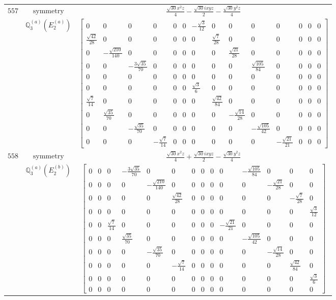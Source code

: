 \documentclass[fleqn,8pt,landscape]{jsarticle}
\begin{document}
\begin{longtable}{ccc}
$ 557 $ & $ \text{symmetry} $ & $ \frac{\sqrt{30} x^{2} z}{4} - \frac{\sqrt{30} i x y z}{2} - \frac{\sqrt{30} y^{2} z}{4} $ \\
$  $ & $ \mathbb{Q}_{3}^{(a)}(E_{2}^{(a)}) $ & $ \begin{bmatrix} 0 & 0 & 0 & 0 & 0 & 0 & - \frac{\sqrt{3}}{12} & 0 & 0 & 0 & 0 & 0 & 0 & 0 \\ \frac{\sqrt{42}}{28} & 0 & 0 & 0 & 0 & 0 & 0 & \frac{\sqrt{7}}{28} & 0 & 0 & 0 & 0 & 0 & 0 \\ 0 & - \frac{\sqrt{210}}{140} & 0 & 0 & 0 & 0 & 0 & 0 & \frac{\sqrt{21}}{28} & 0 & 0 & 0 & 0 & 0 \\ 0 & 0 & - \frac{3 \sqrt{35}}{70} & 0 & 0 & 0 & 0 & 0 & 0 & \frac{\sqrt{105}}{84} & 0 & 0 & 0 & 0 \\ 0 & 0 & 0 & 0 & 0 & 0 & 0 & 0 & 0 & 0 & 0 & 0 & 0 & 0 \\ 0 & 0 & 0 & 0 & 0 & 0 & \frac{\sqrt{3}}{6} & 0 & 0 & 0 & 0 & 0 & 0 & 0 \\ \frac{\sqrt{7}}{14} & 0 & 0 & 0 & 0 & 0 & 0 & \frac{\sqrt{42}}{84} & 0 & 0 & 0 & 0 & 0 & 0 \\ 0 & \frac{\sqrt{35}}{70} & 0 & 0 & 0 & 0 & 0 & 0 & - \frac{\sqrt{14}}{28} & 0 & 0 & 0 & 0 & 0 \\ 0 & 0 & - \frac{\sqrt{35}}{70} & 0 & 0 & 0 & 0 & 0 & 0 & - \frac{\sqrt{105}}{42} & 0 & 0 & 0 & 0 \\ 0 & 0 & 0 & - \frac{\sqrt{7}}{14} & 0 & 0 & 0 & 0 & 0 & 0 & - \frac{\sqrt{21}}{21} & 0 & 0 & 0 \end{bmatrix} $ \\ \hline
$ 558 $ & $ \text{symmetry} $ & $ \frac{\sqrt{30} x^{2} z}{4} + \frac{\sqrt{30} i x y z}{2} - \frac{\sqrt{30} y^{2} z}{4} $ \\
$  $ & $ \mathbb{Q}_{3}^{(a)}(E_{2}^{(b)}) $ & $ \begin{bmatrix} 0 & 0 & 0 & - \frac{3 \sqrt{35}}{70} & 0 & 0 & 0 & 0 & 0 & 0 & - \frac{\sqrt{105}}{84} & 0 & 0 & 0 \\ 0 & 0 & 0 & 0 & - \frac{\sqrt{210}}{140} & 0 & 0 & 0 & 0 & 0 & 0 & - \frac{\sqrt{21}}{28} & 0 & 0 \\ 0 & 0 & 0 & 0 & 0 & \frac{\sqrt{42}}{28} & 0 & 0 & 0 & 0 & 0 & 0 & - \frac{\sqrt{7}}{28} & 0 \\ 0 & 0 & 0 & 0 & 0 & 0 & 0 & 0 & 0 & 0 & 0 & 0 & 0 & \frac{\sqrt{3}}{12} \\ 0 & 0 & \frac{\sqrt{7}}{14} & 0 & 0 & 0 & 0 & 0 & 0 & - \frac{\sqrt{21}}{21} & 0 & 0 & 0 & 0 \\ 0 & 0 & 0 & \frac{\sqrt{35}}{70} & 0 & 0 & 0 & 0 & 0 & 0 & - \frac{\sqrt{105}}{42} & 0 & 0 & 0 \\ 0 & 0 & 0 & 0 & - \frac{\sqrt{35}}{70} & 0 & 0 & 0 & 0 & 0 & 0 & - \frac{\sqrt{14}}{28} & 0 & 0 \\ 0 & 0 & 0 & 0 & 0 & - \frac{\sqrt{7}}{14} & 0 & 0 & 0 & 0 & 0 & 0 & \frac{\sqrt{42}}{84} & 0 \\ 0 & 0 & 0 & 0 & 0 & 0 & 0 & 0 & 0 & 0 & 0 & 0 & 0 & \frac{\sqrt{3}}{6} \\ 0 & 0 & 0 & 0 & 0 & 0 & 0 & 0 & 0 & 0 & 0 & 0 & 0 & 0 \end{bmatrix} $ \\ \hline

\end{longtable}
\end{document}
